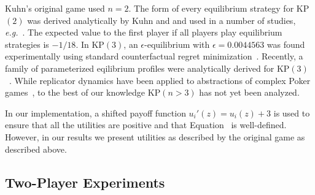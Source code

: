 \documentclass{aamas2014}
\newcommand{\eg}{{\it e.g.}}
\begin{document}
Kuhn's original game used $n = 2$. The form of every equilibrium strategy for KP$(2)$ was derived analytically
by Kuhn and and used in a number of studies, \eg~\cite{hoehn05}. 
The expected value to the first player if all players play equilibrium strategies is $-1/18$. 
In KP$(3)$, an $\epsilon$-equilibrium with $\epsilon = 0.0044563$ was 
found experimentally using standard counterfactual regret minimization~\cite{AbouRisk10}. 
Recently, a family of parameterized eqilibrium profiles were analytically derived for KP$(3)$~\cite{Szafron13Kuhn}.
While replicator dynamics have been applied to abstractions of complex Poker games~\cite{ponsen09b},
to the best of our knowledge KP$(n > 3)$ has not yet been analyzed.  


In our implementation, a shifted payoff function $u_i'(z) = u_i(z) + 3$ is used to ensure that all the utilities are positive
and that Equation~\label{eq:dt-sfrd} is well-defined. However, in our results we present utilities as described by the original
game as described above.


\subsection{Two-Player Experiments}
\end{document}
